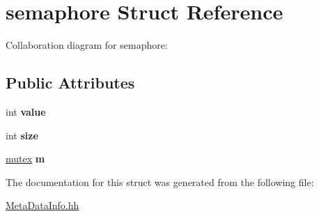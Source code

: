 \hypertarget{structsemaphore}{}\section{semaphore Struct Reference}
\label{structsemaphore}


Collaboration diagram for semaphore\+:
\subsection*{Public Attributes}
\begin{DoxyCompactItemize}
\item 
int {\bfseries value}\hypertarget{structsemaphore_aa5e7bdfb13a681e6b024715d268b743e}{}\label{structsemaphore_aa5e7bdfb13a681e6b024715d268b743e}

\item 
int {\bfseries size}\hypertarget{structsemaphore_a34a13fb41768198ea5bed3fb5173062a}{}\label{structsemaphore_a34a13fb41768198ea5bed3fb5173062a}

\item 
\hyperlink{structmutex}{mutex} {\bfseries m}\hypertarget{structsemaphore_a00a34d6b0fc237ed075ccff8ad90d5e6}{}\label{structsemaphore_a00a34d6b0fc237ed075ccff8ad90d5e6}

\end{DoxyCompactItemize}


The documentation for this struct was generated from the following file\+:\begin{DoxyCompactItemize}
\item 
\hyperlink{_meta_data_info_8hh}{Meta\+Data\+Info.\+hh}\end{DoxyCompactItemize}
